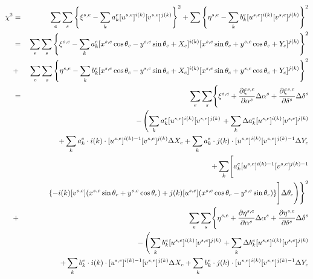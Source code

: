 \documentclass[12pt]{article}
\begin{document}
{\begin{eqnarray}
\chi^2 & = & \sum_e \sum_s \left\{ \xi^{s,e}-\sum_k a_k^e [u^{s,e}]^{i(k)} [v^{s,e}]^{j(k)} \right\}^2 + \sum \left\{ \eta^{s,e}-\sum_k b_k^e [u^{s,e}]^{i(k)} [v^{s,e}]^{j(k)} \right\}^2 \\
& = & \sum_e \sum_s \left\{ \xi^{s,e}-\sum_k a_k^e [x^{s,e}\cos\theta_c-y^{s,c}\sin\theta_c+X_c]^{i(k)} [x^{s,e}\sin\theta_c+y^{s,c}\cos\theta_c+Y_c]^{j(k)} \right\}^2 \nonumber \\
& + & \sum_e \sum_s \left\{ \eta^{s,e}-\sum_k b_k^e [x^{s,e}\cos\theta_c-y^{s,c}\sin\theta_c+X_c]^{i(k)} [x^{s,e}\sin\theta_c+y^{s,c}\cos\theta_c+Y_c]^{j(k)} \right\}^2 \\
& = & \sum_e \sum_s \Biggl\{ \xi^{s,e} + \frac{\partial \xi^{s,e}}{\partial \alpha^{s}} \Delta\alpha^{s} + \frac{\partial \xi^{s,e}}{\partial \delta^{s}} \Delta\delta^{s}  \nonumber \\
&  & \hspace{0.7cm}- \left(\sum_k a_k^e [u^{s,e}]^{i(k)} [v^{s,e}]^{j(k)} \right. +\sum_k \Delta a_k^e [u^{s,e}]^{i(k)} [v^{s,e}]^{j(k)} \nonumber \\
&  & \hspace{1.0cm}+ \sum_k a_k^e \cdot i(k) \cdot [u^{s,e}]^{i(k)-1} [v^{s,e}]^{j(k)} \Delta X_c + \sum_k a_k^e \cdot j(k) \cdot [u^{s,e}]^{i(k)} [v^{s,e}]^{j(k)-1} \Delta Y_c \nonumber \\
&  & \hspace{1.0cm}+ \sum_k \Biggr[ a_k^e [u^{s,e}]^{i(k)-1} [v^{s,e}]^{j(k)-1}  \nonumber \\
& & \hspace{1.0cm} \{-i(k)[v^{s,e}](x^{s,e}\sin\theta_c+y^{s,e}\cos\theta_c)+j(k)[u^{s,e}](x^{s,e}\cos\theta_c-y^{s,e}\sin\theta_c) \} \Biggr] \Delta \theta_c \Biggr) \Biggr\}^2 \nonumber \\
& + & \sum_e \sum_s \Biggl\{ \eta^{s,e} + \frac{\partial \eta^{s,e}}{\partial \alpha^{s}} \Delta\alpha^{s} + \frac{\partial \eta^{s,e}}{\partial \delta^{s}} \Delta\delta^{s}  \nonumber \\
&  & \hspace{0.7cm}- \left(\sum_k b_k^e [u^{s,e}]^{i(k)} [v^{s,e}]^{j(k)} \right. +\sum_k \Delta b_k^e [u^{s,e}]^{i(k)} [v^{s,e}]^{j(k)} \nonumber \\
&  & \hspace{1.0cm}+ \sum_k b_k^e \cdot i(k) \cdot [u^{s,e}]^{i(k)-1} [v^{s,e}]^{j(k)} \Delta X_c + \sum_k b_k^e \cdot j(k) \cdot [u^{s,e}]^{i(k)} [v^{s,e}]^{j(k)-1} \Delta Y_c \nonumber \\

\end{eqnarray}}
\end{document}

